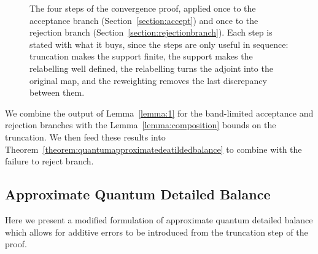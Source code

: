 \documentclass[aps,floatfix,10pt,amssymb,amsfont,amsmath,superscriptaddress,float,nofootinbib,longbibliography,nobalancelastpage,twocolumn]{revtex4-2}
\begin{document}
\begin{figure}[t]
\centering
{}
\caption{The four steps of the convergence proof, applied once to the acceptance branch (Section~\ref{section:accept}) and once to the rejection branch (Section~\ref{section:rejectionbranch}). Each step is stated with what it buys, since the steps are only useful in sequence: truncation makes the support finite, the support makes the relabelling well defined, the relabelling turns the adjoint into the original map, and the reweighting removes the last discrepancy between them.}
\label{fig:proofsteps}
\end{figure}

We combine the output of Lemma~\ref{lemma:1} for the band-limited acceptance and rejection branches with the Lemma~\ref{lemma:composition} bounds on the truncation. We then feed these results into Theorem~\ref{theorem:quantumapproximatedeatildedbalance} to combine with the failure to reject branch.
\subsection{Approximate Quantum Detailed Balance}
\label{section:detailedbalancedef}
Here we present a modified formulation of approximate quantum detailed balance which allows for additive errors to be introduced from the truncation step of the proof. 
\end{document}
